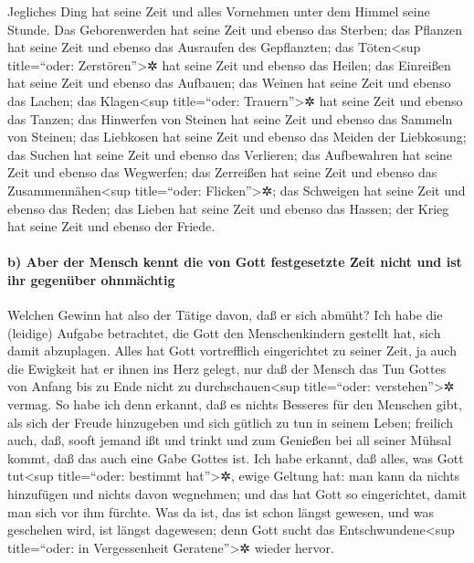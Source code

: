 Jegliches Ding hat seine Zeit und alles Vornehmen unter
dem Himmel seine Stunde. Das Geborenwerden hat seine Zeit
und ebenso das Sterben; das Pflanzen hat seine Zeit und ebenso das
Ausraufen des Gepflanzten; das Töten\textless sup
title=``oder: Zerstören''\textgreater✲ hat seine Zeit und ebenso das
Heilen; das Einreißen hat seine Zeit und ebenso das Aufbauen;
das Weinen hat seine Zeit und ebenso das Lachen; das
Klagen\textless sup title=``oder: Trauern''\textgreater✲ hat seine Zeit
und ebenso das Tanzen; das Hinwerfen von Steinen hat seine
Zeit und ebenso das Sammeln von Steinen; das Liebkosen hat seine Zeit
und ebenso das Meiden der Liebkosung; das Suchen hat seine
Zeit und ebenso das Verlieren; das Aufbewahren hat seine Zeit und ebenso
das Wegwerfen; das Zerreißen hat seine Zeit und ebenso das
Zusammennähen\textless sup title=``oder: Flicken''\textgreater✲; das
Schweigen hat seine Zeit und ebenso das Reden; das Lieben
hat seine Zeit und ebenso das Hassen; der Krieg hat seine Zeit und
ebenso der Friede.

\hypertarget{b-aber-der-mensch-kennt-die-von-gott-festgesetzte-zeit-nicht-und-ist-ihr-gegenuxfcber-ohnmuxe4chtig}{%
\paragraph{b) Aber der Mensch kennt die von Gott festgesetzte Zeit nicht
und ist ihr gegenüber
ohnmächtig}\label{b-aber-der-mensch-kennt-die-von-gott-festgesetzte-zeit-nicht-und-ist-ihr-gegenuxfcber-ohnmuxe4chtig}}

Welchen Gewinn hat also der Tätige davon, daß er sich
abmüht? Ich habe die (leidige) Aufgabe betrachtet, die
Gott den Menschenkindern gestellt hat, sich damit abzuplagen.
Alles hat Gott vortrefflich eingerichtet zu seiner Zeit,
ja auch die Ewigkeit hat er ihnen ins Herz gelegt, nur daß der Mensch
das Tun Gottes von Anfang bis zu Ende nicht zu durchschauen\textless sup
title=``oder: verstehen''\textgreater✲ vermag. So habe
ich denn erkannt, daß es nichts Besseres für den Menschen gibt, als sich
der Freude hinzugeben und sich gütlich zu tun in seinem Leben;
freilich auch, daß, sooft jemand ißt und trinkt und zum
Genießen bei all seiner Mühsal kommt, daß das auch eine Gabe Gottes ist.
Ich habe erkannt, daß alles, was Gott tut\textless sup
title=``oder: bestimmt hat''\textgreater✲, ewige Geltung hat: man kann
da nichts hinzufügen und nichts davon wegnehmen; und das hat Gott so
eingerichtet, damit man sich vor ihm fürchte. Was da ist,
das ist schon längst gewesen, und was geschehen wird, ist längst
dagewesen; denn Gott sucht das Entschwundene\textless sup title=``oder:
in Vergessenheit Geratene''\textgreater✲ wieder hervor.

